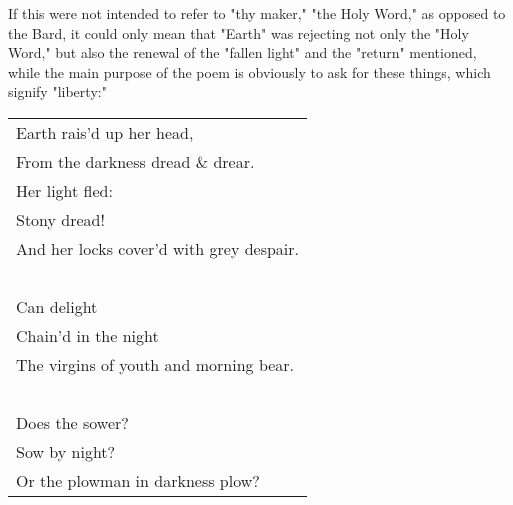 \hspace*{5mm}If this were not intended to refer to "thy maker," "the Holy Word," as opposed to the Bard, it could
only mean that "Earth" was rejecting not only the "Holy Word," but also the renewal of the "fallen light"
and the "return" mentioned, while the main purpose of the poem is obviously to ask for these things, which
signify "liberty:"\par
\begin{center}
	\begin{tabular}{l}
		Earth rais'd up her head,                \\
		From the darkness dread \& drear.        \\
		Her light fled:                          \\
		Stony dread!                             \\
		And her locks cover'd with grey despair. \\
		~                                        \\
		Can delight                              \\
		Chain'd in the night                     \\
		The virgins of youth and morning bear.   \\
		~                                        \\
		Does the sower?                          \\
		Sow by night?                            \\
		Or the plowman in darkness plow?
	\end{tabular}
\end{center}

\newpage

